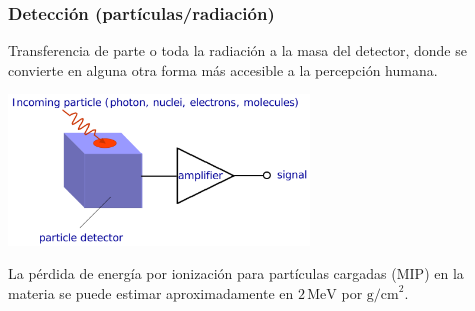 \documentclass{beamer}
\begin{document}
\begin{frame}
				\frametitle{Detección (partículas/radiación)}
				Transferencia de parte o toda la radiación a la masa del detector, donde se convierte en alguna otra forma más accesible a la percepción humana.
								\begin{center}
												\includegraphics[height=0.4\textheight,width=0.6\textwidth]{deteccion_principio}
								\end{center}
								La pérdida de energía por ionización para partículas
								cargadas (MIP) en la materia se puede
								estimar aproximadamente en \alert{$2\,\text{MeV}$ por
								$\text{g/cm}^2$}.
\end{frame}
\end{document}
